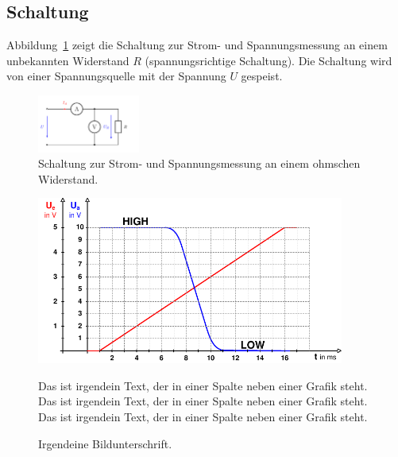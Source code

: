 \documentclass[12pt,a4paper,ngerman]{article}
\begin{document}
\subsection{Schaltung}
Abbildung~\ref{fig:schaltbild} zeigt die Schaltung zur Strom- und Spannungsmessung an einem unbekannten Widerstand $R$ (spannungsrichtige Schaltung). Die Schaltung wird von einer Spannungsquelle mit der Spannung $U$ gespeist.

\begin{figure}[!ht]
	\begin{center}
		\includegraphics[width=0.3\textwidth]{./../03_PICS/schaltbild}
		\caption{Schaltung zur Strom- und Spannungsmessung an einem ohmschen Widerstand.} \label{fig:schaltbild}
	\end{center}
\end{figure}

\vspace{-0.5cm}


\begin{figure}[h!]
	\begin{minipage}{0.2\textwidth}
		\begin{center}
		\vspace{-0.0cm}\includegraphics[width=0.9\textwidth]{./../03_PICS/Prot_A_Pic_02}
		\end{center}
	\end{minipage}%
	\begin{minipage}{0.8\textwidth}
		Das ist irgendein Text, der in einer Spalte neben einer Grafik steht. Das ist irgendein Text, der in einer Spalte neben einer Grafik steht. Das ist irgendein Text, der in einer Spalte neben einer Grafik steht.\\
		\caption{Irgendeine Bildunterschrift.}
		\label{fig:Prot_A_Pic_02}	
	\end{minipage}
\end{figure}
\end{document}
